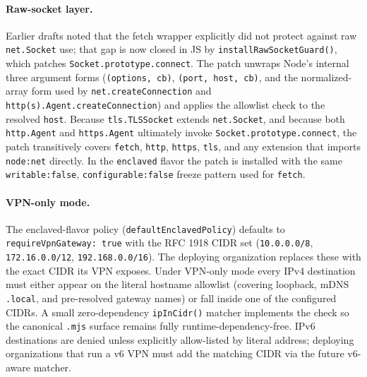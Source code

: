 \documentclass[11pt]{article}
\begin{document}
\paragraph{Raw-socket layer.} Earlier drafts noted that the fetch wrapper
explicitly did not protect against raw \texttt{net.Socket} use; that
gap is now closed in JS by \texttt{installRawSocketGuard()}, which
patches \texttt{Socket.prototype.connect}. The patch unwraps Node's
internal three argument forms (\texttt{(options, cb)},
\texttt{(port, host, cb)}, and the normalized-array form used by
\texttt{net.createConnection} and \texttt{http(s).Agent.createConnection})
and applies the allowlist check to the resolved \texttt{host}. Because
\texttt{tls.TLSSocket} extends \texttt{net.Socket}, and because both
\texttt{http.Agent} and \texttt{https.Agent} ultimately invoke
\texttt{Socket.prototype.connect}, the patch transitively covers
\texttt{fetch}, \texttt{http}, \texttt{https}, \texttt{tls}, and any
extension that imports \texttt{node:net} directly. In the
\texttt{enclaved} flavor the patch is installed with the same
\texttt{writable:false}, \texttt{configurable:false} freeze pattern
used for \texttt{fetch}.

\paragraph{VPN-only mode.}
\begin{sloppypar}
The enclaved-flavor policy
(\texttt{defaultEnclavedPolicy}) defaults to
\texttt{requireVpnGateway:\,true} with the RFC 1918 CIDR set
(\texttt{10.0.0.0/8}, \texttt{172.16.0.0/12}, \texttt{192.168.0.0/16}).
The deploying organization replaces these with the exact CIDR its VPN
exposes. Under
VPN-only mode every IPv4 destination must either appear on the literal
hostname allowlist (covering loopback, mDNS \texttt{.local}, and
pre-resolved gateway names) or fall inside one of the configured CIDRs.
A small zero-dependency \texttt{ipInCidr()} matcher implements the
check so the canonical \texttt{.mjs} surface remains fully
runtime-dependency-free. IPv6 destinations are denied unless explicitly
allow-listed by literal address; deploying organizations that run a v6
VPN must add the matching CIDR via the future v6-aware matcher.
\end{sloppypar}
\end{document}
